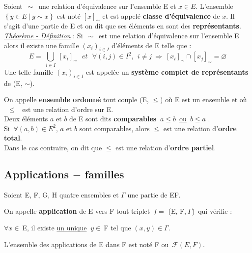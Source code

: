 Soient \(\,\sim\,\) une relation d'équivalence sur l'ensemble E et $x\in E$. L'ensemble \( \left\{ y\in E\ |\ y\sim x \right\} \) est noté \([x]_\sim\) et est appelé \textbf{classe d'équivalence} de $x$. Il s'agit d'une partie de E et on dit que ses éléments en sont des \textbf{représentants}.\vspace{0.1cm} \\
\emph{\underline{Théorème - Définition}} : Si  \(\,\sim\,\)  est une relation d'équivalence sur l'ensemble E alors il existe une famille \((x_i)_{i\in I}\) d'éléments de E telle que : \[E=\ \bigcup _{i\in I}\ [x_i]_{\sim}\ \ \ et\ \ \ \forall (i,j)\in I^2,\ \ i\neq j\  \Rightarrow\ [x_i]_{\sim} \cap [x_j]_{\sim} = \varnothing \] 
\indent Une telle famille \((x_i)_{i\in I}\) est appelée un \textbf{système complet de représentants} de (E, \(\sim\)).

\vspace{1.3cm}

On appelle \textbf{ensemble ordonné} tout couple (E, \(\leq\)) où E est un ensemble et où \ \(\leq\) \ est une relation d'ordre sur E.\vspace{0.1cm} \\
Deux éléments $a$ et $b$ de E sont dits \textbf{comparables} \ssi \(\ a\leq b\,\)  \underline{ou} \(\,b\leq a\) .\vspace{0.1cm} \\
Si \(\ \forall (a,b)\in E^2\),  $a$ et $b$ sont comparables, alors \(\leq\) est une relation d'\textbf{ordre total}. \\
Dans le cas contraire, on dit que  \(\leq\)  est une relation d'\textbf{ordre partiel}.

\newpage

\subsection{Applications $-$ familles}

\vspace{0.7cm}

\begin{center}
Soient E, F, G, H quatre ensembles et \(\Gamma\) une partie de E\x F.
\end{center}

\vspace{1cm}

On appelle \textbf{application} de E vers F tout triplet \(\,f=\) (E, F,\(\ \Gamma\))\, qui vérifie :\vspace{-0.2cm}
\begin{center}
    \(\forall x\in\ \)E, il existe \underline{un unique} \(\ y\in \ \)F tel que \((x,y)\in \Gamma\).
\end{center}\vspace{-0.1cm}
L'ensemble des applications de E dans F est noté F ou \(\,\mathscr{F}(E,F)\).

